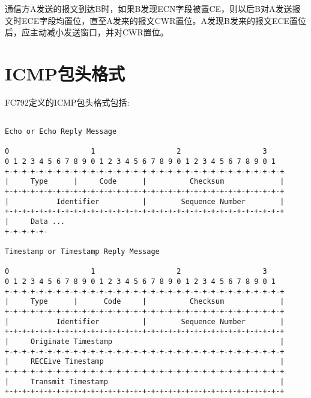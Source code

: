 通信方A发送的报文到达B时，如果B发现ECN字段被置CE，则以后B对A发送报文时ECE字段均置位，直至A发来的报文CWR置位。A发现B发来的报文ECE置位后，应主动减小发送窗口，并对CWR置位。
\label{rfc3168}




\section{ICMP包头格式}
FC792定义的ICMP包头格式包括:
\begin{verbatim}

Echo or Echo Reply Message

0                   1                   2                   3
0 1 2 3 4 5 6 7 8 9 0 1 2 3 4 5 6 7 8 9 0 1 2 3 4 5 6 7 8 9 0 1
+-+-+-+-+-+-+-+-+-+-+-+-+-+-+-+-+-+-+-+-+-+-+-+-+-+-+-+-+-+-+-+-+
|     Type      |     Code      |          Checksum             |
+-+-+-+-+-+-+-+-+-+-+-+-+-+-+-+-+-+-+-+-+-+-+-+-+-+-+-+-+-+-+-+-+
|           Identifier          |        Sequence Number        |
+-+-+-+-+-+-+-+-+-+-+-+-+-+-+-+-+-+-+-+-+-+-+-+-+-+-+-+-+-+-+-+-+
|     Data ...
+-+-+-+-+-

Timestamp or Timestamp Reply Message

0                   1                   2                   3
0 1 2 3 4 5 6 7 8 9 0 1 2 3 4 5 6 7 8 9 0 1 2 3 4 5 6 7 8 9 0 1
+-+-+-+-+-+-+-+-+-+-+-+-+-+-+-+-+-+-+-+-+-+-+-+-+-+-+-+-+-+-+-+-+
|     Type      |      Code     |          Checksum             |
+-+-+-+-+-+-+-+-+-+-+-+-+-+-+-+-+-+-+-+-+-+-+-+-+-+-+-+-+-+-+-+-+
|           Identifier          |        Sequence Number        |
+-+-+-+-+-+-+-+-+-+-+-+-+-+-+-+-+-+-+-+-+-+-+-+-+-+-+-+-+-+-+-+-+
|     Originate Timestamp                                       |
+-+-+-+-+-+-+-+-+-+-+-+-+-+-+-+-+-+-+-+-+-+-+-+-+-+-+-+-+-+-+-+-+
|     RECEive Timestamp                                         |
+-+-+-+-+-+-+-+-+-+-+-+-+-+-+-+-+-+-+-+-+-+-+-+-+-+-+-+-+-+-+-+-+
|     Transmit Timestamp                                        |
+-+-+-+-+-+-+-+-+-+-+-+-+-+-+-+-+-+-+-+-+-+-+-+-+-+-+-+-+-+-+-+-+

\end{verbatim}


















